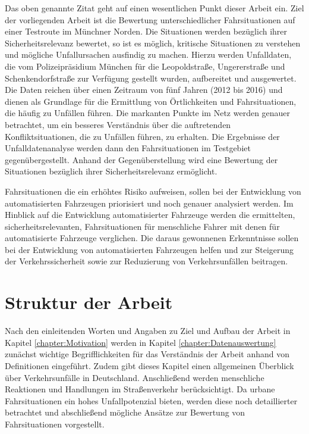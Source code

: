 Das oben genannte Zitat geht auf einen wesentlichen Punkt dieser Arbeit ein. Ziel der vorliegenden Arbeit ist die Bewertung unterschiedlicher Fahrsituationen auf einer Testroute im Münchner Norden. Die Situationen werden bezüglich ihrer Sicherheitsrelevanz bewertet, so ist es möglich, kritische Situationen zu verstehen und mögliche Unfallursachen ausfindig zu machen. Hierzu werden Unfalldaten, die vom Polizeipräsidium München für die Leopoldstraße, Ungererstraße und Schenkendorfstraße zur Verfügung gestellt wurden, aufbereitet und ausgewertet. Die Daten reichen über einen Zeitraum von fünf Jahren (2012 bis 2016) und dienen als Grundlage für die Ermittlung von Örtlichkeiten und Fahrsituationen, die häufig zu Unfällen führen. Die markanten Punkte im Netz werden genauer betrachtet, um ein besseres Verständnis über die auftretenden Konfliktsituationen, die zu Unfällen führen, zu erhalten. Die Ergebnisse der Unfalldatenanalyse werden dann den Fahrsituationen im Testgebiet gegenübergestellt. Anhand der Gegenüberstellung wird eine Bewertung der Situationen bezüglich ihrer Sicherheitsrelevanz ermöglicht.

Fahrsituationen die ein erhöhtes Risiko aufweisen, sollen bei der Entwicklung von automatisierten Fahrzeugen priorisiert und noch genauer analysiert werden. Im Hinblick auf die Entwicklung automatisierter Fahrzeuge werden die ermittelten, sicherheitsrelevanten, Fahrsituationen für menschliche Fahrer mit denen für automatisierte Fahrzeuge verglichen. Die daraus gewonnenen Erkenntnisse sollen bei der Entwicklung von automatisierten Fahrzeugen helfen und zur Steigerung der Verkehrssicherheit sowie zur Reduzierung von Verkehrsunfällen beitragen. 

\section{Struktur der Arbeit}
Nach den einleitenden Worten und Angaben zu Ziel und Aufbau der Arbeit in Kapitel \ref{chapter:Motivation} werden in Kapitel \ref{chapter:Datenauswertung} zunächst wichtige Begrifflichkeiten für das Verständnis der Arbeit anhand von Definitionen eingeführt. Zudem gibt dieses Kapitel einen allgemeinen Überblick über Verkehrsunfälle in Deutschland. Anschließend werden menschliche Reaktionen und Handlungen im Straßenverkehr berücksichtigt. Da urbane Fahrsituationen ein hohes Unfallpotenzial bieten, werden diese noch detaillierter betrachtet und abschließend mögliche Ansätze zur Bewertung von Fahrsituationen vorgestellt.


